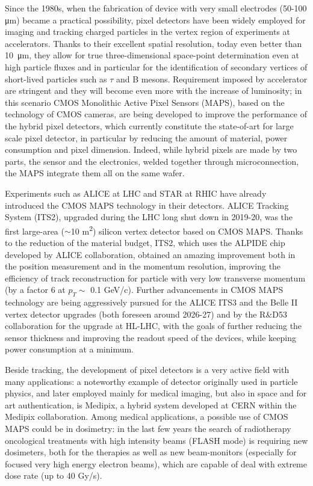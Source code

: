 Since the 1980s, when the fabrication of device with very small electrodes (50-100 \si{\um}) became a practical possibility, pixel detectors have been widely employed for imaging and tracking charged particles in the vertex region of experiments at accelerators. Thanks to their excellent spatial resolution, today even better than \SI{10}{\um}, they allow for true three-dimensional space-point determination even at high particle fluxes and in particular for the identification of secondary vertices of short-lived particles such as $\tau$ and B mesons.
Requirement imposed by accelerator are stringent and they will become even more with the increase of luminosity; in this scenario CMOS Monolithic Active Pixel Sensors (MAPS), based on the technology of CMOS cameras, are being developed to improve the performance of the hybrid pixel detectors, which currently constitute the state-of-art for large scale pixel detector, in particular by reducing the amount of material, power consumption and pixel dimension. Indeed, while hybrid pixels are made by two parts, the sensor and the electronics, welded together through microconnection, the MAPS integrate them all on the same wafer. 

Experiments such as ALICE at LHC and STAR at RHIC have already introduced the CMOS MAPS technology in their detectors. ALICE Tracking System (ITS2), upgraded during the LHC long shut down in 2019-20, was the first large-area ($\sim$10 \si{m^2}) silicon vertex detector based on CMOS MAPS. Thanks to the reduction of the material budget, ITS2, which uses the ALPIDE chip developed by ALICE collaboration, obtained an amazing improvement both in the position measurement and in the momentum resolution, improving the efficiency of track reconstruction for particle with very low transverse momentum (by a factor 6 at $p_{T}\sim$ 0.1 \si{GeV/c}).
Further advancements in CMOS MAPS technology are being aggressively pursued for the ALICE ITS3 and the Belle II vertex detector upgrades (both foreseen around 2026-27) and by the R$\&$D53 collaboration for the upgrade at HL-LHC, with the goals of further reducing the sensor thickness and improving the readout speed of the devices, while keeping power consumption at a minimum.

Beside tracking, the development of pixel detectors is a very active field with many applications: a noteworthy example of detector originally used in particle physics, and later employed mainly for medical imaging, but also in space and for art authentication, is Medipix, a hybrid system developed at CERN within the Medipix collaboration.
Among medical applications, a possible use of CMOS MAPS could be in dosimetry: in the last few years the search of radiotherapy oncological treatments with high intensity beams (FLASH mode) is requiring new dosimeters, both for the therapies as well as new beam-monitors (especially for focused very high energy electron beams), which are capable of deal with extreme dose rate (up to 40 \si{Gy/s}).

